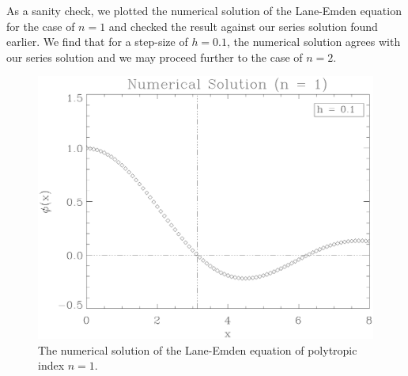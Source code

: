\documentclass[12pt, manuscript]{article}
\begin{document}
    As a sanity check, we plotted the numerical solution of the Lane-Emden equation for the case of $n = 1$ and checked the result against our series solution found earlier. We find that for a step-size of $h = 0.1$, the numerical solution agrees with our series solution and we may proceed further to the case of $n = 2$.
    \begin{figure}[H]
        \begin{center}
            \includegraphics[scale=0.58]{images/rk4plotn1.eps}
            \caption{The numerical solution of the Lane-Emden equation of polytropic index $n = 1$.}
            \label{fig:numplot2}
        \end{center}
    \end{figure}
\end{document}

